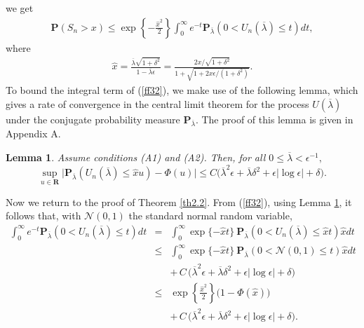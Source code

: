 \documentclass{gSTA2e}
\theoremstyle{plain}
\newtheorem{lemma}[theorem]{Lemma}
\theoremstyle{definition}
\theoremstyle{remark}
\begin{document}
we get
\begin{eqnarray} \label{ff32}
\mathbf{P}(S_n>x )
 \leq    \exp \left\{- \frac{\hat{x}^2}{2}  \right\}   \int_0^{\infty}  e^{ -  t  } \mathbf{P}_{\overline{\lambda}}(0 < U_n(\overline{\lambda}) \leq t) dt,
\end{eqnarray}
where
\begin{eqnarray}\label{fineq40}
\hat{x}=\frac{\overline{\lambda}\sqrt{1+\delta^2}}{1-\overline{\lambda}\epsilon}=\frac{2x/\sqrt{1+\delta^2}}{1+\sqrt{1+2x\epsilon/(1+\delta^2)}}.
\end{eqnarray}
To bound the integral term of (\ref{ff32}), we make use of the following lemma, which gives
 a rate of convergence in the central limit theorem for the
process $U( \overline{\lambda}  )$ under the conjugate probability measure $\mathbf{P}_{ \overline{\lambda}  }.$ The proof of this lemma is given in Appendix A.
\begin{lemma}
\label{LEMMA4}
Assume conditions (A1) and (A2). Then, for all $0 \leq \overline{\lambda} < \epsilon^{-1},$
\[
\sup_{u\in \mathbf{R}}\Big| \mathbf{P}_{\overline{\lambda}} (  U_n(\overline{\lambda} )   \leq  \widehat{x}u)-\Phi (  u)\Big| \leq
C\Big( \overline{\lambda}^2 \epsilon + \overline{\lambda} \delta^2 + \epsilon \left| \log  \epsilon
 \right| +   \delta \Big) .
\]
\end{lemma}
Now we return to the proof of Theorem \ref{th2.2}.  From (\ref{ff32}), using Lemma {\ref{LEMMA4}},
it follows that, with $\mathcal{N}(0,1)$ the standard normal random variable,
\begin{eqnarray}
\int_0^{\infty}  e^{ -  t  } \mathbf{P}_{\overline{\lambda}}(0 < U_n(\overline{\lambda}) \leq t) dt
&=&   \int_0^{\infty}  \exp\{ - \widehat{x}  t  \}\ \mathbf{P}_{\overline{\lambda} }
(0 < U_n(\overline{\lambda})\leq \widehat{x}t) \widehat{x} dt \nonumber \\
&\leq&   \int_0^{\infty}  \exp\{ - \widehat{x}   t  \}\ \mathbf{P} _{\overline{\lambda}}
(0 < \mathcal{N}(0,1) \leq t) \widehat{x}dt \nonumber \\
& &  + \, C\, \Big( \overline{\lambda}^2 \epsilon + \overline{\lambda} \delta^2 + \epsilon \left| \log  \epsilon
 \right| +   \delta \Big) \nonumber \\
&\leq&  \exp\left\{ \frac { \widehat{x}^2} { 2}     \right\} \Big(1 - \Phi(\widehat{x}) \Big)  \label{sgbs}\\
& &  + \, C\, \Big( \overline{\lambda}^2 \epsilon + \overline{\lambda} \delta^2 + \epsilon \left| \log  \epsilon
 \right| +   \delta  \Big). \nonumber
\end{eqnarray}
\end{document}
